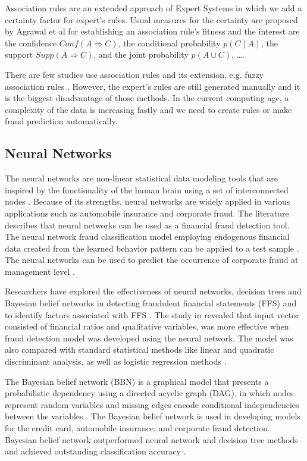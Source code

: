 Association rules are an extended approach of Expert Systems in which we add a certainty factor for expert's rules. Usual measures for the certainty are proposed by Agrawal et al \cite{agrawal1993mining} for establishing an association rule’s fitness and the interest
are the confidence $Conf(A \Rightarrow C)$, the conditional probability $p(C \mid A)$, the support $Supp(A \Rightarrow C)$, and the joint probability $p(A \cup C)$, \dots.

There are few studies use association rules and its extension, e.g. fuzzy association rules \cite{sanchez2009association}. However, the expert's rules are still generated manually and it is the biggest disadvantage of those methods. In the current computing age, a complexity of the data is increasing fastly and we need to create rules or make fraud prediction automatically.


\subsection*{Neural Networks}

The neural networks are non-linear statistical data modeling tools that are inspired by the functionality of the human brain using a set of interconnected nodes \citep{yeh2009comparisons, ghosh1994credit}. Because of its strengths, neural networks are widely applied in various applications such as automobile insurance and corporate fraud. The literature describes that neural networks can be used as a financial fraud detection tool. The neural network fraud classification model employing endogenous financial data created from the learned behavior pattern can be applied to a test sample \citep{green1997assessing}. The neural networks can be used to predict the occurrence of corporate fraud at management level \citep{cerullo1999using}.

Researchers have explored the effectiveness of neural networks, decision trees and Bayesian belief networks in detecting fraudulent financial statements (FFS) and to identify factors associated with FFS \citep{kirkos2007data}. The study in \citep{fanning1998neural} revealed that input vector consisted of financial ratios and qualitative variables, was more effective when fraud detection model was developed using the neural network. The model was also compared with standard statistical methods like linear and quadratic discriminant analysis, as well as logistic regression methods \citep{fanning1998neural}.

The Bayesian belief network (BBN) is a graphical model that presents a probabilistic dependency using a directed acyclic graph (DAG), in which nodes represent random variables and missing edges encode conditional independencies between the variables \citep{kirkos2007data}. The Bayesian belief network is used in developing models for the credit card, automobile insurance, and corporate fraud detection. Bayesian belief network outperformed neural network and decision tree methods and achieved outstanding classification accuracy \citep{kirkos2007data}.


